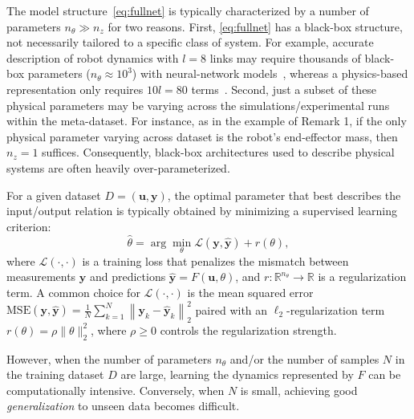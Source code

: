\documentclass{article}
\newcommand{\norm}[1]{\left\lVert#1\right\rVert}
\newcommand{\seq}[1]{{\mathbf{#1}}}
\newcommand{\R}{\mathbb{R}}
\newcommand{\latent}{z}
\newcommand{\fullpar}{\theta}
\newcommand{\loss}{\mathcal{L}}
\begin{document}
The model structure~\eqref{eq:fullnet} is typically characterized by a number of parameters $n_\fullpar \gg n_\latent$ for two reasons. First, \eqref{eq:fullnet} has a black-box structure, not necessarily tailored to a specific class of system. For example, accurate description of robot dynamics with $l=8$ links may require thousands of black-box parameters ($n_\fullpar \approx 10^3$) with neural-network models~\cite{Bem25}, whereas a physics-based representation only requires $10l = 80$ terms~\cite{gaz2019dynamic}.
Second, just a subset of these physical parameters may be varying across the simulations/experimental runs within the meta-dataset. For instance, as in the example of Remark 1, if the only physical parameter varying across dataset is the robot's end-effector mass, then $n_z=1$ suffices.
Consequently, black-box architectures used to describe physical systems are often heavily over-parameterized.

For a given dataset $D=(\seq{u},\seq{y})$, the optimal parameter that best describes the input/output relation is typically obtained by minimizing a supervised learning criterion:
\begin{equation}
    \label{eq:full_sysid}
    \hat \fullpar = \arg \min_{\fullpar} \loss(\seq y, \hat{\seq y}) + r(\theta), 
\end{equation}
where $\loss(\cdot, \cdot)$ is a training loss that penalizes the mismatch between measurements $\seq y$ and predictions $\hat{\seq y}=F(\seq u, \fullpar)$, and $r:\R^{n_\theta}\to\R$ is a regularization term. A common choice for $\loss(\cdot, \cdot)$
is the mean squared error $
\mathrm{MSE}(\seq y, \hat {\seq y}) = \frac{1}{N}\sum_{k=1}^N 
\norm{\seq{y}_k -  \hat {\seq{y}}_k}_2^2$
paired with an $\ell_2$-regularization term $r(\theta)=\rho\|\theta\|_2^2$, where $\rho\geq 0$ controls the regularization strength. 

However, when the number of parameters $n_\theta$ and/or the number of samples $N$ in the training dataset $D$ are large, learning the dynamics represented by $F$ can be computationally intensive. Conversely, when $N$ is small, achieving good {\it generalization} to unseen data becomes difficult.
\end{document}
